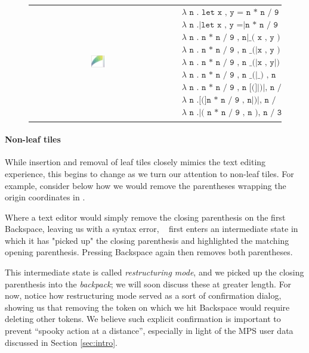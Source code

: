 \begin{figure}
  \begin{tabular}{cp{}}
  \includegraphics[width=0.1\textwidth]{img/circles-parabola-grow-2.png}
  &
  {
    \begin{align*}
      & \texttt{$\lambda$ n . let x , y = n * n / 9 , n|in ( x , y ) , n / 3} \\
      & \texttt{$\lambda$ n .|let x , y =|n * n / 9 , n[in] ( x , y ) , n / 3} \\
      & \texttt{$\lambda$ n . n * n / 9 , n|\_ ( x , y ) , n / 3} \\
      & \texttt{$\lambda$ n . n * n / 9 , n \_ (|x , y ) , n / 3} \\
      & \texttt{$\lambda$ n . n * n / 9 , n \_ (|x , y|) , n / 3} \\
      & \texttt{$\lambda$ n . n * n / 9 , n \_ (|\_ ) , n / 3} \\
      & \texttt{$\lambda$ n . n * n / 9 , n [(]|)|, n / 3} \\
      & \texttt{$\lambda$ n .[(]n * n / 9 , n|)|, n / 3} \\
      & \texttt{$\lambda$ n .|( n * n / 9 , n ), n / 3}
    \end{align*}
  }
  \end{tabular}
\end{figure}

\paragraph{Non-leaf tiles}
While insertion and removal of leaf tiles closely mimics the
text editing experience, this begins to change as we turn our
attention to non-leaf tiles.
For example, consider below how we would remove the parentheses
wrapping the origin coordinates in \tylr.


Where a text editor would simply remove the closing parenthesis
on the first Backspace, leaving us with a syntax error,
\tylr~ first enters an intermediate state in which it has
"picked up" the closing parenthesis and highlighted the
matching opening parenthesis.
Pressing Backspace again then removes both parentheses.

This intermediate state is called \emph{restructuring mode},
and we picked up the closing parenthesis into the \emph{backpack};
we will soon discuss these at greater length.
For now, notice how restructuring mode served as a
sort of confirmation dialog, showing us that removing
the token on which we hit Backspace would require
deleting other tokens.
We believe such explicit confirmation is important to
prevent ``spooky action at a distance'', especially
in light of the MPS user data discussed in Section \ref{sec:intro}.

